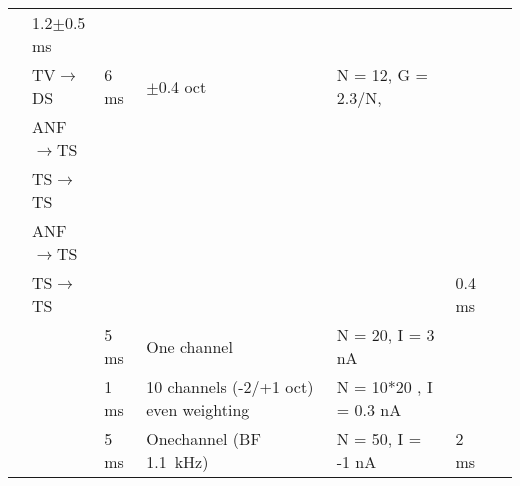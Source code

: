 \begin{longtable}{cXXXXXX}
                                                  & 1.2$\pm$0.5 ms \\ 
                                                  &  TV\ensuremath{\rightarrow}DS   &     6 ms      &                               $\pm$0.4 oct                                & N = 12, G = 2.3/N,        
                                                  & \\ 
         \citealp*{WiegrebeMeddis:2004}           &  ANF\ensuremath{\rightarrow}TS  &               &                                                                           & 
                                                  & \\ 
                                                  &  TS\ensuremath{\rightarrow}TS   &               &                                                                           & 

                                                  & \\ \midrule
\citealp*{BahmerLangner:2006,BahmerLangner:2006a} &  ANF\ensuremath{\rightarrow}TS  &               &                                                                           & 
                                                  & \\ 
                                                  &  TS\ensuremath{\rightarrow}TS   &               &                                                                           & 
                                                  & 0.4 ms\\ \midrule


      \citealp*{PressnitzerMeddisEtAl:2001}       &                                 &    {5 ms}     &                               {One channel}                               & N = 20,     I =  3 nA                       
                                                  & \\ 
                                                  &                                 &    {1 ms}     &                 {10 channels (-2/+1 oct) even weighting }                 & N = 10*20 , I = 0.3 nA                      
                                                  & \\ 
                                                  &                                 &     5 ms      &                     Onechannel (BF 1.1~kHz)                      & N = 50,   I = -1 nA   
                                                  & 2 ms \\ \midrule


\end{longtable}
